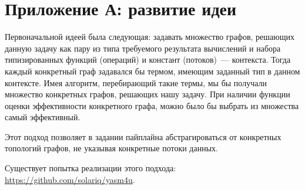 \section{Приложение А: развитие идеи} %

Первоначальной идеей была следующая: задавать множество графов, решающих данную задачу как пару из типа требуемого результата вычислений и набора типизированных функций (операций) и констант (потоков)~--- контекста.
Тогда каждый конкретный граф задавался бы термом, имеющим заданный тип в данном контексте.
Имея алгоритм, перебирающий такие термы, мы бы получали множество конкретных графов, решающих нашу задачу.
При наличии функции оценки эффективности конкретного графа, можно было бы выбрать из множества самый эффективный.

Этот подход позволяет в задании пайплайна абстрагироваться от конкретных топологий графов, не указывая конкретные потоки данных.

Существует попытка реализации этого подхода: \url{https://github.com/solariq/yasm4u}.


